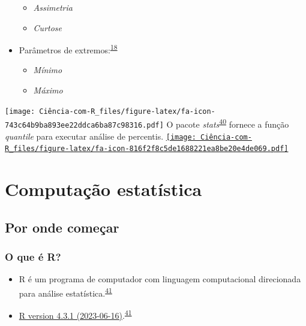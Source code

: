 \documentclass[
]{book}
\begin{document}
\begin{itemize}
  \begin{itemize}
  \item
    \emph{Assimetria}
  \item
    \emph{Curtose}
  \end{itemize}
\item
  Parâmetros de extremos:\textsuperscript{\protect\hyperlink{ref-Ali2016}{18}}

  \begin{itemize}
  \item
    \emph{Mínimo}
  \item
    \emph{Máximo}
  \end{itemize}
\end{itemize}

\texttt{[image: Ciência-com-R\_files/figure-latex/fa-icon-743c64b9ba893ee22ddca6ba87c98316.pdf]} O pacote \emph{stats}\textsuperscript{\protect\hyperlink{ref-base}{40}} fornece a função \emph{quantile} para executar análise de percentis. \href{https://stat.ethz.ch/R-manual/R-devel/library/stats/html/quantile.html}{\texttt{[image: Ciência-com-R\_files/figure-latex/fa-icon-816f2f8c5de1688221ea8be20e4de069.pdf]}}

\hypertarget{computacao-estatistica}{%
\chapter{\texorpdfstring{\textbf{Computação estatística}}{Computação estatística}}\label{computacao-estatistica}}

\hypertarget{inicio}{%
\section{Por onde começar}\label{inicio}}

\hypertarget{o-que-uxe9-r}{%
\subsection{O que é R?}\label{o-que-uxe9-r}}

\begin{itemize}
\item
  R é um programa de computador com linguagem computacional direcionada para análise estatística.\textsuperscript{\protect\hyperlink{ref-ihaka1996}{41}}
\item
  \href{https://cran.rstudio.com/}{R version 4.3.1 (2023-06-16)}.\textsuperscript{\protect\hyperlink{ref-ihaka1996}{41}}
\end{itemize}
\end{document}
